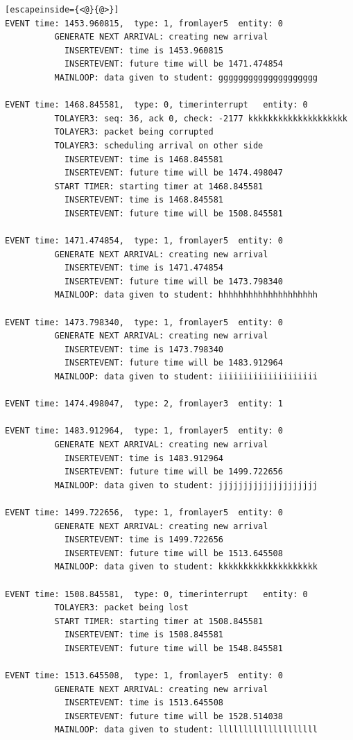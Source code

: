 \documentclass[paper=a4, fontsize=11pt]{scrartcl}
\numberwithin{equation}{section}		%
\numberwithin{figure}{section}			%
\numberwithin{table}{section}				%
\begin{document}
\begin{lstlisting}[escapeinside={<@}{@>}]
EVENT time: 1453.960815,  type: 1, fromlayer5  entity: 0
          GENERATE NEXT ARRIVAL: creating new arrival
            INSERTEVENT: time is 1453.960815
            INSERTEVENT: future time will be 1471.474854
          MAINLOOP: data given to student: gggggggggggggggggggg

EVENT time: 1468.845581,  type: 0, timerinterrupt   entity: 0
          TOLAYER3: seq: 36, ack 0, check: -2177 kkkkkkkkkkkkkkkkkkkk
          TOLAYER3: packet being corrupted
          TOLAYER3: scheduling arrival on other side
            INSERTEVENT: time is 1468.845581
            INSERTEVENT: future time will be 1474.498047
          START TIMER: starting timer at 1468.845581
            INSERTEVENT: time is 1468.845581
            INSERTEVENT: future time will be 1508.845581

EVENT time: 1471.474854,  type: 1, fromlayer5  entity: 0
          GENERATE NEXT ARRIVAL: creating new arrival
            INSERTEVENT: time is 1471.474854
            INSERTEVENT: future time will be 1473.798340
          MAINLOOP: data given to student: hhhhhhhhhhhhhhhhhhhh

EVENT time: 1473.798340,  type: 1, fromlayer5  entity: 0
          GENERATE NEXT ARRIVAL: creating new arrival
            INSERTEVENT: time is 1473.798340
            INSERTEVENT: future time will be 1483.912964
          MAINLOOP: data given to student: iiiiiiiiiiiiiiiiiiii

EVENT time: 1474.498047,  type: 2, fromlayer3  entity: 1

EVENT time: 1483.912964,  type: 1, fromlayer5  entity: 0
          GENERATE NEXT ARRIVAL: creating new arrival
            INSERTEVENT: time is 1483.912964
            INSERTEVENT: future time will be 1499.722656
          MAINLOOP: data given to student: jjjjjjjjjjjjjjjjjjjj

EVENT time: 1499.722656,  type: 1, fromlayer5  entity: 0
          GENERATE NEXT ARRIVAL: creating new arrival
            INSERTEVENT: time is 1499.722656
            INSERTEVENT: future time will be 1513.645508
          MAINLOOP: data given to student: kkkkkkkkkkkkkkkkkkkk

EVENT time: 1508.845581,  type: 0, timerinterrupt   entity: 0
          TOLAYER3: packet being lost
          START TIMER: starting timer at 1508.845581
            INSERTEVENT: time is 1508.845581
            INSERTEVENT: future time will be 1548.845581

EVENT time: 1513.645508,  type: 1, fromlayer5  entity: 0
          GENERATE NEXT ARRIVAL: creating new arrival
            INSERTEVENT: time is 1513.645508
            INSERTEVENT: future time will be 1528.514038
          MAINLOOP: data given to student: llllllllllllllllllll


\end{lstlisting}
\end{document}
